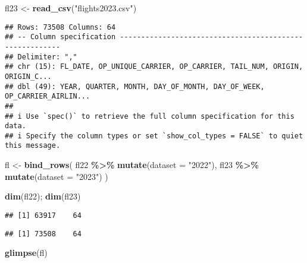 \documentclass[
]{article}
\newenvironment{Shaded}{\begin{snugshade}}{\end{snugshade}}
\newcommand{\AttributeTok}[1]{\textcolor[rgb]{0.13,0.29,0.53}{#1}}
\newcommand{\FunctionTok}[1]{\textcolor[rgb]{0.13,0.29,0.53}{\textbf{#1}}}
\newcommand{\NormalTok}[1]{#1}
\newcommand{\OtherTok}[1]{\textcolor[rgb]{0.56,0.35,0.01}{#1}}
\newcommand{\SpecialCharTok}[1]{\textcolor[rgb]{0.81,0.36,0.00}{\textbf{#1}}}
\newcommand{\StringTok}[1]{\textcolor[rgb]{0.31,0.60,0.02}{#1}}
\begin{document}
\begin{Shaded}
\begin{Highlighting}[]
\NormalTok{fl23 }\OtherTok{\textless{}{-}} \FunctionTok{read\_csv}\NormalTok{(}\StringTok{"flights2023.csv"}\NormalTok{)}
\end{Highlighting}
\end{Shaded}

\begin{verbatim}
## Rows: 73508 Columns: 64
## -- Column specification --------------------------------------------------------
## Delimiter: ","
## chr (15): FL_DATE, OP_UNIQUE_CARRIER, OP_CARRIER, TAIL_NUM, ORIGIN, ORIGIN_C...
## dbl (49): YEAR, QUARTER, MONTH, DAY_OF_MONTH, DAY_OF_WEEK, OP_CARRIER_AIRLIN...
## 
## i Use `spec()` to retrieve the full column specification for this data.
## i Specify the column types or set `show_col_types = FALSE` to quiet this message.
\end{verbatim}

\begin{Shaded}
\begin{Highlighting}[]
\NormalTok{fl    }\OtherTok{\textless{}{-}} \FunctionTok{bind\_rows}\NormalTok{(}
\NormalTok{  fl22 }\SpecialCharTok{\%\textgreater{}\%} \FunctionTok{mutate}\NormalTok{(}\AttributeTok{dataset =} \StringTok{"2022"}\NormalTok{),}
\NormalTok{  fl23 }\SpecialCharTok{\%\textgreater{}\%} \FunctionTok{mutate}\NormalTok{(}\AttributeTok{dataset =} \StringTok{"2023"}\NormalTok{)}
\NormalTok{)}

\FunctionTok{dim}\NormalTok{(fl22); }\FunctionTok{dim}\NormalTok{(fl23)}
\end{Highlighting}
\end{Shaded}

\begin{verbatim}
## [1] 63917    64
\end{verbatim}

\begin{verbatim}
## [1] 73508    64
\end{verbatim}

\begin{Shaded}
\begin{Highlighting}[]
\FunctionTok{glimpse}\NormalTok{(fl)}
\end{Highlighting}
\end{Shaded}
\end{document}
